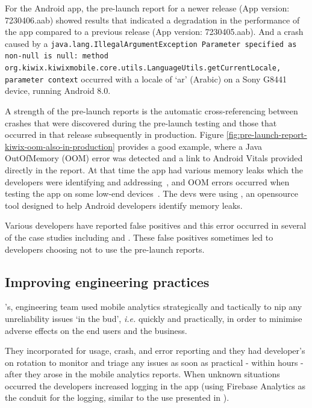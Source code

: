 For the  Android app, the pre-launch report for a newer release (App version: 7230406.aab) showed results that indicated a degradation in the performance of the app compared to a previous release (App version: 7230405.aab). And a crash caused by a \texttt{java.lang.IllegalArgumentException Parameter specified as non-null is null: method org.kiwix.kiwixmobile.core.utils.LanguageUtils.getCurrentLocale, parameter context} occurred with a locale of `ar' (Arabic) on a Sony G8441 device, running Android 8.0.

A strength of the pre-launch reports is the automatic cross-referencing between crashes that were discovered during the pre-launch testing and those that occurred in that release subsequently in production. Figure \ref{fig:pre-launch-report-kiwix-oom-also-in-production} provides a good example, where a Java OutOfMemory (OOM) error was detected and a link to Android Vitals provided directly in the report. At that time the app had various memory leaks which the developers were identifying and addressing~, and OOM errors occurred when testing the app on some low-end devices~. The devs were using , an opensource tool designed to help Android developers identify memory leaks. 

Various developers have reported false positives  and this error occurred in several of the case studies including  and . These false positives sometimes led to developers choosing not to use the pre-launch reports.

\subsection{Improving engineering practices}
's, engineering team used mobile analytics strategically and tactically to nip any unreliability issues `in the bud', \emph{i.e.} quickly and practically, in order to minimise adverse effects on the end users and the business. 

They incorporated  for usage, crash, and  error reporting and they had developer's on rotation to monitor and triage any issues as soon as practical - within hours - after they arose in the mobile analytics reports. When unknown situations occurred the developers increased logging in the app (using Firebase Analytics as the conduit for the logging, similar to the use presented in ).


